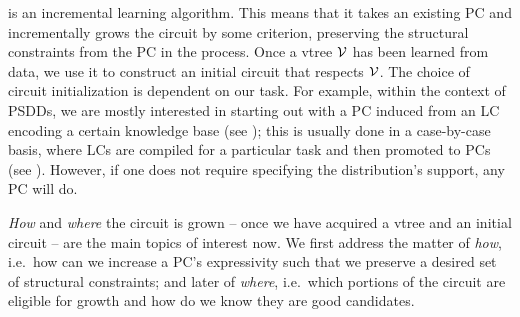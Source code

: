  is an incremental learning algorithm. This means that it takes an existing PC
and incrementally grows the circuit by some criterion, preserving the structural constraints from
the PC in the process. Once a vtree $\operatorname{\mathcal{V}}$ has been learned from data, we use it to construct an
initial circuit that respects $\operatorname{\mathcal{V}}$. The choice of circuit initialization is dependent on our
task. For example, within the context of PSDDs, we are mostly interested in starting out with a PC
induced from an LC encoding a certain knowledge base (see ); this is usually
done in a case-by-case basis, where LCs are compiled for a particular task and then promoted to PCs
(see ). However, if one does not require specifying the distribution's support,
any PC will do.

\emph{How} and \emph{where} the circuit is grown -- once we have acquired a vtree and an initial
circuit -- are the main topics of interest now. We first address the matter of \emph{how}, i.e.\
how can we increase a PC's expressivity such that we preserve a desired set of structural
constraints; and later of \emph{where}, i.e.\ which portions of the circuit are eligible for
growth and how do we know they are good candidates.

